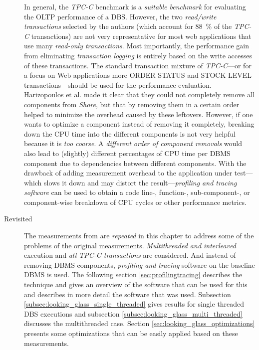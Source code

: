 \begin{description}
        In general, the \textit{TPC-C} benchmark is a \emph{suitable benchmark} for evaluating the OLTP performance of a DBS. However, the two \emph{read/write transactions} selected by the authors (which account for \SI{88}{\percent} of the \textit{TPC-C} transactions) are not very representative for most web applications that use many \emph{read-only transactions}. Most importantly, the performance gain from eliminating \emph{transaction logging} is entirely based on the write accesses of these transactions. The standard transaction mixture of \textit{TPC-C}---or for a focus on Web applications more ORDER STATUS and STOCK LEVEL transactions---should be used for the performance evaluation.\\
        Harizopoulos et al. made it clear that they could not completely remove all components from \textit{Shore}, but that by removing them in a certain order helped to minimize the overhead caused by these leftovers. However, if one wants to optimize a component instead of removing it completely, breaking down the CPU time into the different components is not very helpful because it is \emph{too coarse}. A \emph{different order of component removals} would also lead to (slightly) different percentages of CPU time per DBMS component due to dependencies between different components. With the drawback of adding measurement overhead to the application under test---which slows it down and may distort the result---\emph{profiling and tracing software} can be used to obtain a code line-, function-, sub-component-, or component-wise breakdown of CPU cycles or other performance metrics.
        \item[Revisited] The measurements from \cite{Harizopoulos:2008} are \emph{repeated} in this chapter to address some of the problems of the original measurements. \emph{Multithreaded and interleaved} execution and \emph{all \textit{TPC-C} transactions} are considered. And instead of removing DBMS components, \emph{profiling and tracing} software on the baseline DBMS is used. The following section \ref{sec:profilingtracing} describes the technique and gives an overview of the software that can be used for this and describes in more detail the software that was used. Subsection \ref{subsec:looking_glass_single_threaded} gives results for single threaded DBS executions and subsection \ref{subsec:looking_glass_multi_threaded} discusses the multithreaded case. Section \ref{sec:looking_glass_optimizations} presents some optimizations that can be easily applied based on these measurements.
    \end{description}


